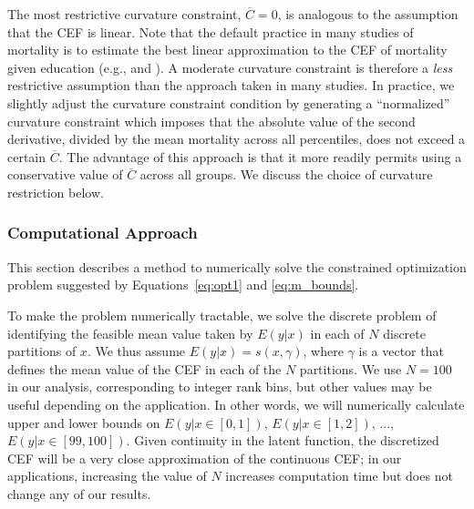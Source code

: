 The most restrictive curvature constraint, $\overline{C}=0$, is
analogous to the assumption that the CEF is linear. Note that the
default practice in many studies of mortality is to estimate the best
linear approximation to the CEF of mortality given education (e.g.,
\citet{Cutler2011} and \citet{Goldring2016}). A moderate curvature
constraint is therefore a \textit{less} restrictive assumption than
the approach taken in many studies. In practice, we slightly adjust the curvature
constraint condition by generating a ``normalized'' curvature
constraint which imposes that the absolute value of the second
derivative, divided by the mean mortality across all percentiles, does
not exceed a certain $\overline{C}$. The advantage of this approach is
that it more readily permits using a conservative value of $\overline{C}$ across
all groups. We discuss the choice of curvature
restriction below. 

\subsubsection{Computational Approach} 

This section describes a method to numerically solve the constrained optimization problem suggested by Equations~\ref{eq:opt1} and \ref{eq:m_bounds}. 

To make the problem numerically tractable, we solve the discrete problem of identifying the feasible mean value taken by $E(y|x)$ in each of $N$ discrete partitions of $x$. We thus assume $E(y|x) = s(x,\gamma)$, where $\gamma$ is a vector that defines the mean value of the CEF in each of the $N$ partitions. We use $N=100$ in our analysis, corresponding to integer rank bins, but other values may be useful depending on the application. In other words, we will numerically calculate upper and lower bounds on $E(y|x \in [0, 1])$, $E(y|x \in [1, 2])$, $...$, $E(y|x \in [99,100])$.  Given continuity in the latent function, the discretized CEF will be a very close approximation of the continuous CEF; in our applications, increasing the value of $N$ increases computation time but does not change any of our results.

